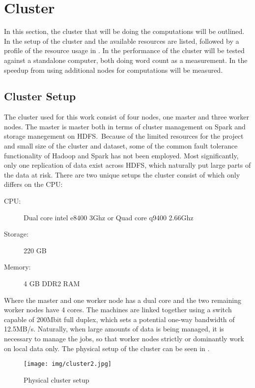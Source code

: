 \section{Cluster}\label{sec:cluster}
In this section, the cluster that will be doing the computations will be outlined. In  the setup of the cluster and the available resources are listed, followed by a profile of the resource usage in . In  the performance of the cluster will be tested against a standalone computer, both doing word count as a measurement. In  the speedup from using additional nodes for computations will be measured.

\subsection{Cluster Setup}\label{sec:clustersetup}

The cluster used for this work consist of four nodes, one master and three worker nodes. The master is master both in terms of cluster management on Spark and storage manegement on HDFS.\ Because of the limited resources for the project and small size of the cluster and dataset, some of the common fault tolerance functionality of Hadoop and Spark has not been employed. Most significantly, only one replication of data exist across HDFS, which naturally put large parts of the data at risk. There are two unique setups the cluster consist of which only differs on the CPU:\@
\begin{description}
\item[CPU:] Dual core intel e8400 3Ghz or Quad core q9400 2.66Ghz
\item[Storage:] 220 GB
\item[Memory:] 4 GB DDR2 RAM
\end{description}

Where the master and one worker node has a dual core and the two remaining worker nodes have 4 cores. The machines are linked together using a switch capable of 200Mbit full duplex, which sets a potential one-way bandwidth of 12.5MB/s. Naturally, when large amounts of data is being managed, it is necessary to manage the jobs, so that worker nodes strictly or dominantly work on local data only. The physical setup of the cluster can be seen in .

\begin{figure}[!htb]
  \centering
    \texttt{[image: img/cluster2.jpg]}
  \caption{Physical cluster setup}\label{fig:clustersetup}
\end{figure}

